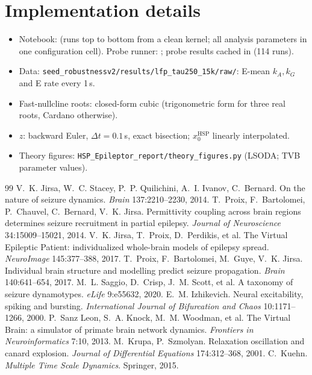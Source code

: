 \documentclass[11pt]{article}
\newcommand{\kA}{k_A}
\newcommand{\kG}{k_G}
\newcommand{\xh}{x_0^{\mathrm{HSP}}}
\begin{document}
\appendix
\section{Implementation details}
\begin{itemize}
\item Notebook:  (runs top to bottom from a clean kernel; all analysis
parameters in one configuration cell). Probe runner: ; probe results cached in
 (114 runs).
\item Data: \texttt{seed\_robustnessv2/results/lfp\_tau250\_15k/raw/}: E-mean $\kA,\kG$ and E rate every 1\,s.
\item Fast-nullcline roots: closed-form cubic (trigonometric form for three real roots, Cardano otherwise).
\item $z$: backward Euler, $\Delta t=0.1$\,s, exact bisection; $\xh$ linearly interpolated.
\item Theory figures: \texttt{HSP\_Epileptor\_report/theory\_figures.py} (LSODA; TVB parameter values).
\end{itemize}

\begin{thebibliography}{99}\small
{} V.~K. Jirsa, W.~C. Stacey, P.~P. Quilichini, A.~I. Ivanov, C.~Bernard. On the nature of seizure
dynamics. \emph{Brain} 137:2210--2230, 2014.
 T.~Proix, F.~Bartolomei, P.~Chauvel, C.~Bernard, V.~K. Jirsa. Permittivity coupling across brain
regions determines seizure recruitment in partial epilepsy. \emph{Journal of Neuroscience} 34:15009--15021, 2014.
 V.~K. Jirsa, T.~Proix, D.~Perdikis, et al. The Virtual Epileptic Patient: individualized whole-brain
models of epilepsy spread. \emph{NeuroImage} 145:377--388, 2017.
 T.~Proix, F.~Bartolomei, M.~Guye, V.~K. Jirsa. Individual brain structure and modelling predict
seizure propagation. \emph{Brain} 140:641--654, 2017.
 M.~L. Saggio, D.~Crisp, J.~M. Scott, et al. A taxonomy of seizure dynamotypes. \emph{eLife}
9:e55632, 2020.
 E.~M. Izhikevich. Neural excitability, spiking and bursting. \emph{International Journal of
Bifurcation and Chaos} 10:1171--1266, 2000.
 P.~Sanz Leon, S.~A. Knock, M.~M. Woodman, et al. The Virtual Brain: a simulator of primate brain
network dynamics. \emph{Frontiers in Neuroinformatics} 7:10, 2013.
 M.~Krupa, P.~Szmolyan. Relaxation oscillation and canard explosion. \emph{Journal of Differential
Equations} 174:312--368, 2001.
 C.~Kuehn. \emph{Multiple Time Scale Dynamics}. Springer, 2015.
\end{thebibliography}
\end{document}
